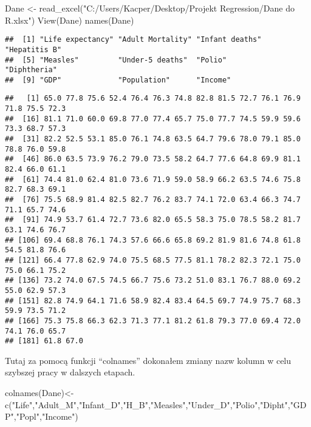 \documentclass[
]{article}
\newenvironment{Shaded}{\begin{snugshade}}{\end{snugshade}}
\newcommand{\FunctionTok}[1]{\textcolor[rgb]{0.00,0.00,0.00}{#1}}
\newcommand{\NormalTok}[1]{#1}
\newcommand{\OtherTok}[1]{\textcolor[rgb]{0.56,0.35,0.01}{#1}}
\newcommand{\SpecialCharTok}[1]{\textcolor[rgb]{0.00,0.00,0.00}{#1}}
\newcommand{\StringTok}[1]{\textcolor[rgb]{0.31,0.60,0.02}{#1}}
\begin{document}
\begin{Shaded}
\begin{Highlighting}[]
\NormalTok{Dane }\OtherTok{\textless{}{-}}  \FunctionTok{read\_excel}\NormalTok{(}\StringTok{"C:/Users/Kacper/Desktop/Projekt Regression/Dane do R.xlsx"}\NormalTok{)}
\FunctionTok{View}\NormalTok{(Dane)}
\FunctionTok{names}\NormalTok{(Dane)}
\end{Highlighting}
\end{Shaded}

\begin{verbatim}
##  [1] "Life expectancy" "Adult Mortality" "Infant deaths"   "Hepatitis B"    
##  [5] "Measles"         "Under-5 deaths"  "Polio"           "Diphtheria"     
##  [9] "GDP"             "Population"      "Income"
\end{verbatim}

\begin{Shaded}
\end{Shaded}

\begin{verbatim}
##   [1] 65.0 77.8 75.6 52.4 76.4 76.3 74.8 82.8 81.5 72.7 76.1 76.9 71.8 75.5 72.3
##  [16] 81.1 71.0 60.0 69.8 77.0 77.4 65.7 75.0 77.7 74.5 59.9 59.6 73.3 68.7 57.3
##  [31] 82.2 52.5 53.1 85.0 76.1 74.8 63.5 64.7 79.6 78.0 79.1 85.0 78.8 76.0 59.8
##  [46] 86.0 63.5 73.9 76.2 79.0 73.5 58.2 64.7 77.6 64.8 69.9 81.1 82.4 66.0 61.1
##  [61] 74.4 81.0 62.4 81.0 73.6 71.9 59.0 58.9 66.2 63.5 74.6 75.8 82.7 68.3 69.1
##  [76] 75.5 68.9 81.4 82.5 82.7 76.2 83.7 74.1 72.0 63.4 66.3 74.7 71.1 65.7 74.6
##  [91] 74.9 53.7 61.4 72.7 73.6 82.0 65.5 58.3 75.0 78.5 58.2 81.7 63.1 74.6 76.7
## [106] 69.4 68.8 76.1 74.3 57.6 66.6 65.8 69.2 81.9 81.6 74.8 61.8 54.5 81.8 76.6
## [121] 66.4 77.8 62.9 74.0 75.5 68.5 77.5 81.1 78.2 82.3 72.1 75.0 75.0 66.1 75.2
## [136] 73.2 74.0 67.5 74.5 66.7 75.6 73.2 51.0 83.1 76.7 88.0 69.2 55.0 62.9 57.3
## [151] 82.8 74.9 64.1 71.6 58.9 82.4 83.4 64.5 69.7 74.9 75.7 68.3 59.9 73.5 71.2
## [166] 75.3 75.8 66.3 62.3 71.3 77.1 81.2 61.8 79.3 77.0 69.4 72.0 74.1 76.0 65.7
## [181] 61.8 67.0
\end{verbatim}

Tutaj za pomocą funkcji ``colnames'' dokonałem zmiany nazw kolumn w celu
szybszej pracy w dalszych etapach.

\begin{Shaded}
\begin{Highlighting}[]
\FunctionTok{colnames}\NormalTok{(Dane)}\OtherTok{\textless{}{-}}\FunctionTok{c}\NormalTok{(}\StringTok{"Life"}\NormalTok{,}\StringTok{"Adult\_M"}\NormalTok{,}\StringTok{"Infant\_D"}\NormalTok{,}\StringTok{"H\_B"}\NormalTok{,}\StringTok{"Measles"}\NormalTok{,}\StringTok{"Under\_D"}\NormalTok{,}\StringTok{"Polio"}\NormalTok{,}\StringTok{"Dipht"}\NormalTok{,}\StringTok{"GDP"}\NormalTok{,}\StringTok{"Popl"}\NormalTok{,}\StringTok{"Income"}\NormalTok{)}
\end{Highlighting}
\end{Shaded}
\end{document}
